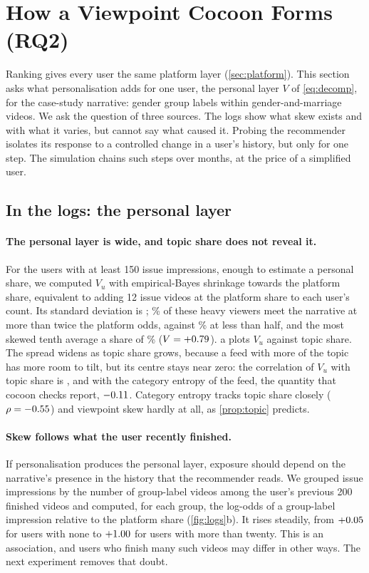\section{How a Viewpoint Cocoon Forms (RQ2)}
\label{sec:formation}

Ranking gives every user the same platform layer (\cref{sec:platform}). This section asks what personalisation adds for one user, the personal layer $V$ of \cref{eq:decomp}, for the case-study narrative: gender group labels within gender-and-marriage videos. We ask the question of three sources. The logs show what skew exists and with what it varies, but cannot say what caused it. Probing the recommender isolates its response to a controlled change in a user's history, but only for one step. The simulation chains such steps over months, at the price of a simplified user.

\subsection{In the logs: the personal layer}
\label{sec:logs}

\paragraph{The personal layer is wide, and topic share does not reveal it.} For the \nNHeavy{} users with at least 150 issue impressions, enough to estimate a personal share, we computed $V_u$ with empirical-Bayes shrinkage towards the platform share, equivalent to adding 12 issue videos at the platform share to each user's count. Its standard deviation is \nFunnelSD; \nFunnelHi\% of these heavy viewers meet the narrative at more than twice the platform odds, against \nFunnelLo\% at less than half, and the most skewed tenth average a share of \nTopDecileShare\% ($V=+0.79$). a plots $V_u$ against topic share. The spread widens as topic share grows, because a feed with more of the topic has more room to tilt, but its centre stays near zero: the correlation of $V_u$ with topic share is \nRhoMV, and with the category entropy of the feed, the quantity that cocoon checks report, $-0.11$. Category entropy tracks topic share closely ($\rho=-0.55$) and viewpoint skew hardly at all, as \cref{prop:topic} predicts.

\paragraph{Skew follows what the user recently finished.} If personalisation produces the personal layer, exposure should depend on the narrative's presence in the history that the recommender reads. We grouped issue impressions by the number of group-label videos among the user's previous 200 finished videos and computed, for each group, the log-odds of a group-label impression relative to the platform share (\cref{fig:logs}b). It rises steadily, from $+0.05$ for users with none to $+1.00$ for users with more than twenty. This is an association, and users who finish many such videos may differ in other ways. The next experiment removes that doubt.

